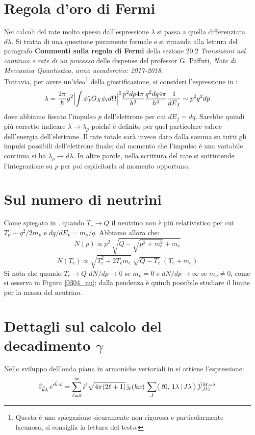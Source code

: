 \section{Regola d'oro di Fermi}\label{compl-orofermi}
Nei calcoli del rate molto spesso dall'espressione $\lambda$ si passa a quella differenziata $d\lambda$. Si tratta di una questione puramente formale e si rimanda alla lettura del paragrafo \textbf{Commenti sulla regola di Fermi} della sezione 20.2 \textit{Transizioni nel continuo e rate di un processo} delle dispense del professor G. Paffuti, \textit{Note di Meccanica Quantistica, anno accademico: 2017-2018}.\\
Tuttavia, per avere un'idea\footnote{Questa è una spiegazione sicuramente non rigorosa e particolarmente lacunosa, si consiglia la lettura del testo.} della giustificazione, si consideri l'espressione in :
$$\lambda = \frac{2\pi}{\hbar}g^2 \Bigl |\int \phi_f^* O_X \phi_i d\Omega\Bigr |^2 \frac{p^2 dp 4\pi}{h^3}\frac{q^2dq4\pi}{h^3}\frac{1}{dE_f} \sim  p^2 q^2 dp $$
dove abbiamo fissato l'impulso $p$ dell'elettrone per cui $dE_f = dq$. Sarebbe quindi più corretto indicare $\lambda \to \lambda_p$ poiché è definito per quel particolare valore dell'energia dell'elettrone. Il rate totale sarà invece dato dalla somma su tutti gli impulsi possibili dell'elettrone finale; dal momento che l'impulso è una variabile continua si ha $\lambda_p \to d\lambda$. In altre parole, nella scrittura del rate si sottintende l'integrazione su $p$ per poi esplicitarla al momento opportuno.
 
\section{Sul numero di neutrini}\label{compl-neutrini}
Come spiegato in , quando $T_e \to Q$ il neutrino non è più relativistico per cui $T_\nu\sim q^2/2m_\nu$ e $dq/dE_\nu = m_\nu/q$. Abbiamo allora che:
$$N(p)\propto p^2 \: \sqrt{Q-\sqrt{p^2+m_e^2} + m_e}$$ 
$$N(T_e)\propto \sqrt{T_e^2+2T_em_e} \: \sqrt{Q-T_e} \: (T_e+m_e)$$
Si nota che quando $T_e\to Q$ $dN/dp\to 0$ se $m_\nu = 0$ e $dN/dp\to \infty$ se $m_\nu \not = 0$, come si osserva in Figura \ref{0304_nu}; dalla pendenza è quindi possibile studiare il limite per la massa del neutrino.

\section{Dettagli sul calcolo del decadimento $\gamma$}\label{compl-passaggi}
Nello sviluppo dell'onda piana in armoniche vettoriali in  si ottiene l'espressione:
$$\widehat{\varepsilon}_{\vec{k}\lambda}\, e^{i\vec{k}\cdot\vec{x}} = \sum_{\ell=0}^\infty i^\ell \sqrt{4\pi(2\ell+1)}\, \mathrm{j}_\ell (kx) \, \sum_J \bigl\langle\, \ell 0 ,\, 1\lambda\, |\, J\lambda\, \bigr\rangle\, \vec{\mathcal{Y}}^{M=\lambda}_{J\ell 1}$$

